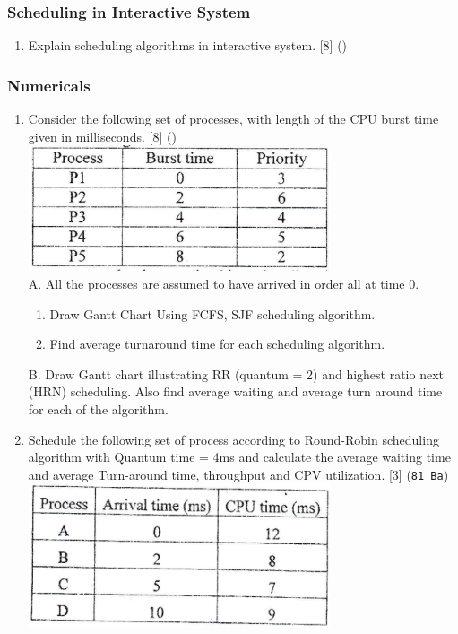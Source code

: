 \documentclass[12pt]{article}
\begin{document}
	\subsubsection{Scheduling in Interactive System}
	\begin{enumerate}[noitemsep, topsep = 0pt]
		\item Explain scheduling algorithms in interactive system. \hfill [8] ()
	\end{enumerate}
	\subsubsection{Numericals}
	\begin{enumerate}
		\item Consider the following set of processes, with length of the CPU burst time given in milliseconds. \hfill [8] ()\\
		\includegraphics[width=3.5in]{os_1}\\
		A. All the processes are assumed to have arrived in order all at time 0.
		\begin{enumerate}[noitemsep, topsep = 0pt, label = \alph*.]
			\item Draw Gantt Chart Using FCFS, SJF scheduling algorithm.
			\item Find average turnaround time for each scheduling algorithm.
		\end{enumerate}
		B. Draw Gantt chart illustrating RR (quantum = 2) and highest ratio next (HRN) scheduling. Also find average waiting and average turn around time for each of the algorithm.
		
		\item Schedule the following set of process according to Round-Robin scheduling algorithm with Quantum time = 4ms and calculate the average waiting time and average Turn-around time, throughput and CPV utilization. \hfill [3] (\texttt{81 Ba})\\
		\includegraphics[width=3.5in]{os_2}
		

\end{enumerate}
\end{document}
